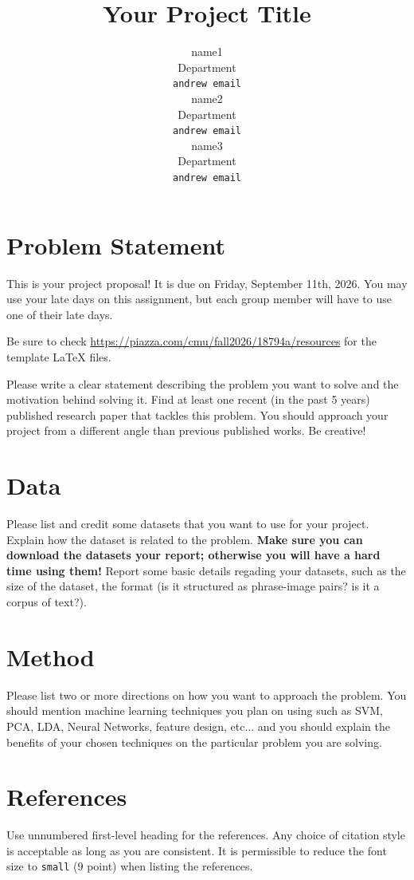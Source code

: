\documentclass{article}
\title{Your Project Title}
\author{%
  name1 \\
  Department \\
  \texttt{andrew email} \\
  \And
  name2 \\
  Department \\
  \texttt{andrew email} \\
  \And
  name3 \\
  Department \\
  \texttt{andrew email} \\
}
\begin{document}
\maketitle

\section{Problem Statement}
This is your project proposal! It is due on Friday, September 11th, 2026. You may use your late days on this assignment, but each group member will have to use one of their late days.

Be sure to check \url{https://piazza.com/cmu/fall2026/18794a/resources} for the template LaTeX files.

Please write a clear statement describing the problem you want to solve and the
motivation behind solving it. Find at least one recent (in the past 5 years)
published research paper that tackles this problem. You should approach your
project from a different angle than previous published works. Be creative!

\section{Data}
Please list and credit some datasets that you want to use for your project.
Explain how the dataset is related to the problem. \textbf{Make sure you can
download the datasets your report; otherwise you will have a hard time using
them!} Report some basic details regading your datasets, such as the size of
the dataset, the format (is it structured as phrase-image pairs? is it a corpus
of text?).

\section{Method}
Please list two or more directions on how you want to approach the problem. You
should mention machine learning techniques you plan on using such as SVM, PCA,
LDA, Neural Networks, feature design, etc... and you should explain the
benefits of your chosen techniques on the particular problem you are solving.

\section*{References}
Use unnumbered first-level heading for the references. Any choice of citation
style is acceptable as long as you are consistent. It is permissible to reduce
the font size to \verb+small+ (9 point) when listing the references.
\end{document}

